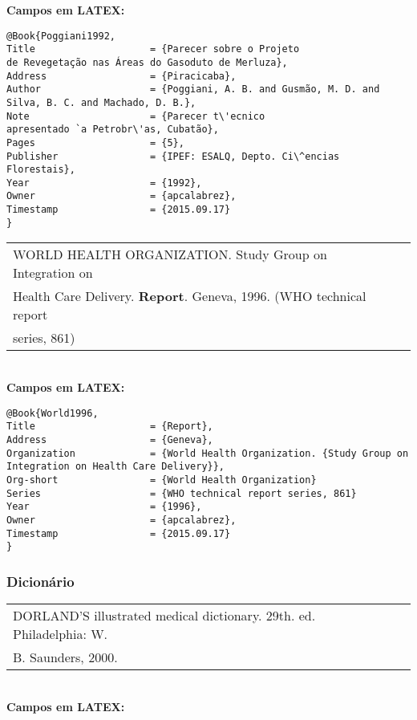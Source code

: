 \textbf{Campos em LATEX:}

\begin{verbatim}
@Book{Poggiani1992,
Title                    = {Parecer sobre o Projeto
de Revegetação nas Áreas do Gasoduto de Merluza},
Address                  = {Piracicaba},
Author                   = {Poggiani, A. B. and Gusmão, M. D. and 
Silva, B. C. and Machado, D. B.},
Note                     = {Parecer t\'ecnico
apresentado `a Petrobr\'as, Cubatão},
Pages                    = {5},
Publisher                = {IPEF: ESALQ, Depto. Ci\^encias Florestais},
Year                     = {1992},
Owner                    = {apcalabrez},
Timestamp                = {2015.09.17}
}
\end{verbatim}

\begin{tabular}{|l|c|} \hline
WORLD HEALTH ORGANIZATION.  Study Group on Integration on \\ Health Care Delivery.  \textbf{Report}. Geneva, 1996. (WHO technical report \\ series, 861)  \\\hline
\end{tabular}\\

\textbf{Campos em LATEX:}

\begin{verbatim}
@Book{World1996,
Title                    = {Report},
Address                  = {Geneva},
Organization             = {World Health Organization. {Study Group on 
Integration on Health Care Delivery}},
Org-short                = {World Health Organization}
Series                   = {WHO technical report series, 861}
Year                     = {1996},
Owner                    = {apcalabrez},
Timestamp                = {2015.09.17}
}
\end{verbatim}


\subsubsection{Dicion\'ario}

\begin{tabular}{|l|c|} \hline
	DORLAND'S illustrated medical dictionary. 29th. ed. Philadelphia: W.\\B. Saunders, 2000.   \\\hline
\end{tabular}\\


\textbf{Campos em LATEX:}

